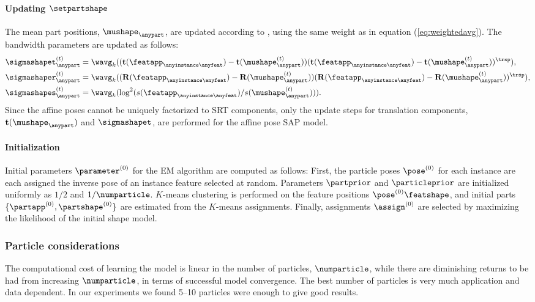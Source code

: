 \paragraph{Updating $\setpartshape$}
The mean part positions, $\mushape_\anypart$, are updated according to \cite{Pham2011}, using the same weight as in equation (\ref{eq:weightedavg}). The bandwidth parameters are updated as follows:
\begin{align}
\sigmashapet_{\anypart}^{(t)} & = \wavg_k((\mathbf{t}(\featapp_{\anyinstance\anyfeat}) - \mathbf{t}(\mushape_{\anypart}^{(t)}))(\mathbf{t}(\featapp_{\anyinstance\anyfeat}) - \mathbf{t}(\mushape_{\anypart}^{(t)}))^\trsp),\label{eq:updatemeant}\\ 
\sigmashaper_{\anypart}^{(t)} & = \wavg_k((\mathbf{R}(\featapp_{\anyinstance\anyfeat}) - \mathbf{R}(\mushape_{\anypart}^{(t)}))(\mathbf{R}(\featapp_{\anyinstance\anyfeat}) - \mathbf{R}(\mushape_{\anypart}^{(t)}))^\trsp),\label{eq:updatedmeanr}\\
\sigmashapes_{\anypart}^{(t)} & = \wavg_k(\log^2(s(\featapp_{\anyinstance\anyfeat})/s(\mushape_{\anypart}^{(t)}))). \label{eq:updatemeans}
\end{align}
Since the affine poses cannot be uniquely factorized to SRT components, only the update steps for translation components, \ie $\mathbf{t}(\mushape_\anypart)$ and $\sigmashapet$, are performed for the affine pose SAP model. 

\paragraph{Initialization}
Initial parameters $\parameter^{(0)}$ for the EM algorithm are computed as follows: First, the particle poses $\pose^{(0)}$ for each instance are each assigned the inverse pose of an instance feature selected at random. Parameters $\partprior$ and $\particleprior$ are initialized uniformly as $1/2$ and $1/\numparticle$. $K$-means clustering is performed on the feature positions $\pose^{(0)}\featshape$, and initial parts $\{\partapp^{(0)}, \partshape^{(0)}\}$ are estimated from the $K$-means assignments. Finally, assignments $\assign^{(0)}$ are selected by maximizing the likelihood of the initial shape model.

\subsubsection{Particle considerations}
The computational cost of learning the model is linear in the number of particles, $\numparticle$, while there are diminishing returns to be had from increasing $\numparticle$, in terms of successful model convergence. The best number of particles is very much application and data dependent. In our experiments we found 5--10 particles were enough to give good results.

